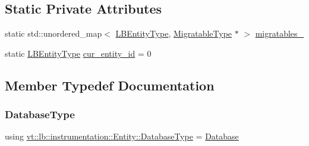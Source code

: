 \subsection*{Static Private Attributes}
\begin{DoxyCompactItemize}
\item 
static std\+::unordered\+\_\+map$<$ \hyperlink{namespacevt_a92ec26fb6644cd0ba7eb0ee70c96bee5}{L\+B\+Entity\+Type}, \hyperlink{structvt_1_1lb_1_1instrumentation_1_1_entity_a40dd6e30c20027d66b9193323d9e0cb0}{Migratable\+Type} $\ast$ $>$ \hyperlink{structvt_1_1lb_1_1instrumentation_1_1_entity_a1c2098186f1b468294ec3cd8beb0ffbc}{migratables\+\_\+}
\item 
static \hyperlink{namespacevt_a92ec26fb6644cd0ba7eb0ee70c96bee5}{L\+B\+Entity\+Type} \hyperlink{structvt_1_1lb_1_1instrumentation_1_1_entity_a954c797480b06ad1f85643802a35141e}{cur\+\_\+entity\+\_\+id} = 0
\end{DoxyCompactItemize}


\subsection{Member Typedef Documentation}
\mbox{\label{structvt_1_1lb_1_1instrumentation_1_1_entity_a2c8b6bfe6f30a4407a996aaae856b052}} 
\subsubsection{\texorpdfstring{Database\+Type}{DatabaseType}}
{\footnotesize\ttfamily using \hyperlink{structvt_1_1lb_1_1instrumentation_1_1_entity_a2c8b6bfe6f30a4407a996aaae856b052}{vt\+::lb\+::instrumentation\+::\+Entity\+::\+Database\+Type} =  \hyperlink{structvt_1_1lb_1_1instrumentation_1_1_database}{Database}}

\mbox{\label{structvt_1_1lb_1_1instrumentation_1_1_entity_a40dd6e30c20027d66b9193323d9e0cb0}} 
